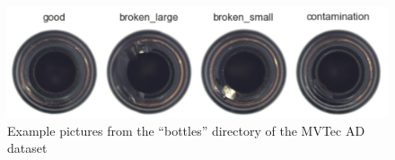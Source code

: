 \begin{figure}[H]
    \centering
    \includegraphics[scale=0.55]{src/images/dataset_example_w_labels.png}
    \caption{Example pictures from the ``bottles'' directory of the MVTec AD dataset}
    \label{fig:dataset_example}
\end{figure}